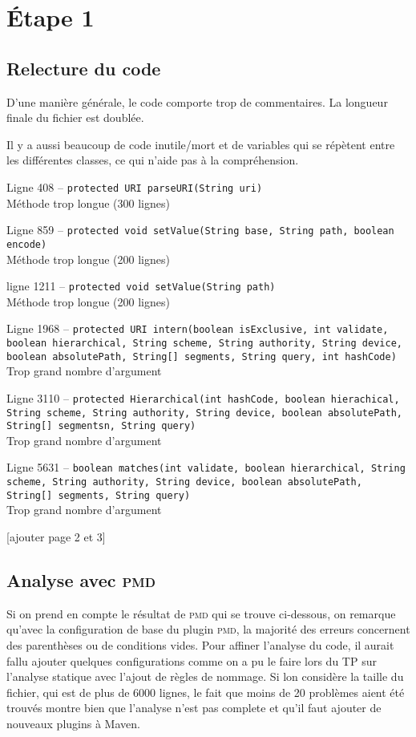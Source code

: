 \section{\'Etape 1}
	\subsection{Relecture du code}
		D'une manière générale, le code comporte trop de commentaires. La longueur finale du fichier est doublée.
		
		Il y a aussi beaucoup de code inutile/mort et de variables qui se répètent entre les différentes classes, ce qui n'aide pas à la compréhension.

		Ligne 408 -- \texttt{protected URI parseURI(String uri)}\\
		Méthode trop longue (300 lignes)
		

		Ligne 859 -- \texttt{protected void setValue(String base, String path, boolean encode)}\\
		Méthode trop longue (200 lignes)
		

		ligne 1211 -- \texttt{protected void setValue(String path)}\\
		Méthode trop longue (200 lignes)
		

		Ligne 1968 -- \texttt{protected URI intern(boolean isExclusive, int validate, boolean hierarchical, String scheme, String authority, String device, boolean absolutePath, String[] segments, String query, int hashCode)}\\
		Trop grand nombre d'argument
		

		Ligne 3110 -- \texttt{protected Hierarchical(int hashCode, boolean hierachical, String scheme, String authority, String device, boolean absolutePath, String[] segmentsn, String query)}\\
		Trop grand nombre d'argument
		

		Ligne 5631 -- \texttt{boolean matches(int validate, boolean hierarchical, String scheme, String authority, String device, boolean absolutePath, String[] segments, String query)}\\
		Trop grand nombre d'argument

		[ajouter page 2 et 3]



		
	\subsection{Analyse avec \textsc{pmd}}
		Si on prend en compte le résultat de \textsc{pmd} qui se trouve ci-dessous, on remarque qu'avec la configuration de base du plugin \textsc{pmd}, la majorité des erreurs concernent des parenthèses ou de conditions vides. Pour affiner l'analyse du code, il aurait fallu ajouter quelques configurations comme on a pu le faire lors du TP sur l'analyse statique avec l'ajout de règles de nommage. Si lon considère la taille du fichier, qui est de plus de 6000 lignes, le fait que moins de 20 problèmes aient été trouvés montre bien que l'analyse n'est pas complete et qu'il faut ajouter de nouveaux plugins à Maven.

